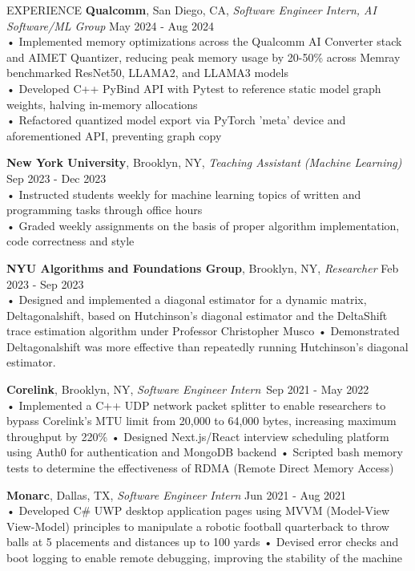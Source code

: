 \documentclass{resume} %
\begin{document}
\begin{rSection}{EXPERIENCE}
\textbf{Qualcomm}, San Diego, CA, {\emph{Software Engineer Intern, AI Software/ML Group}} \hfill May 2024 - Aug 2024 \\ 
• Implemented memory optimizations across the Qualcomm AI Converter stack and AIMET Quantizer, reducing peak memory usage by 20-50\% across Memray benchmarked ResNet50, LLAMA2, and LLAMA3 models \\
• Developed C++ PyBind API with Pytest to reference static model graph weights, halving in-memory allocations \\
• Refactored quantized model export via PyTorch 'meta' device and aforementioned API, preventing graph copy

\textbf{New York University}, Brooklyn, NY, {\emph{Teaching Assistant (Machine Learning)}} \hfill Sep 2023 - Dec 2023 \\
• Instructed students weekly for machine learning topics of written and programming tasks through office hours \\
• Graded weekly assignments on the basis of proper algorithm implementation, code correctness and style 

\textbf {NYU Algorithms and Foundations Group}, Brooklyn, NY, {\emph{Researcher}} \hfill Feb 2023 - Sep 2023 \\
• Designed and implemented a diagonal estimator for a dynamic matrix, Deltagonalshift, based on Hutchinson's diagonal estimator and the DeltaShift trace estimation algorithm under Professor Christopher Musco \newline
• Demonstrated Deltagonalshift was more effective than repeatedly running Hutchinson's diagonal estimator. 

\textbf{Corelink}, Brooklyn, NY, {\emph{Software Engineer Intern}}\ \hfill Sep 2021 - May 2022 \\
• Implemented a C++ UDP network packet splitter to enable researchers to bypass Corelink's MTU limit from 20,000 to 64,000 bytes, increasing maximum throughput by 220\% \newline
• Designed Next.js/React interview scheduling platform using Auth0 for authentication and MongoDB backend \newline
• Scripted bash memory tests to determine the effectiveness of RDMA (Remote Direct Memory Access) 

\textbf{Monarc}, Dallas, TX, {\emph{Software Engineer Intern}} \hfill Jun 2021 - Aug 2021 \\
• Developed C\# UWP desktop application pages using MVVM (Model-View View-Model) principles to manipulate a robotic football quarterback to throw balls at 5 placements and distances up to 100 yards \newline
• Devised error checks and boot logging to enable remote debugging, improving the stability of the machine \smallskip
\end{rSection} 
\end{document}
